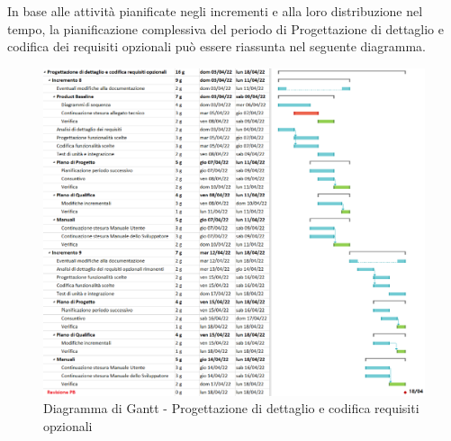 In base alle attività pianificate negli incrementi e alla loro distribuzione nel tempo, la pianificazione complessiva del periodo di Progettazione di dettaglio e codifica dei requisiti opzionali può essere riassunta nel seguente diagramma.
\begin{figure}[H]
  \centering
  \includegraphics[scale=0.56]{immagini/prog_requisiti_opzionali.png}
  \caption{Diagramma di Gantt - Progettazione di dettaglio e codifica requisiti opzionali}
\end{figure}
\pagebreak


